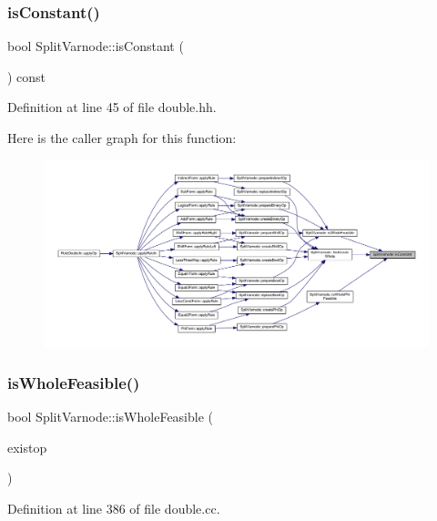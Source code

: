 \subsubsection{\texorpdfstring{isConstant()}{isConstant()}}
{\footnotesize\ttfamily bool Split\+Varnode\+::is\+Constant (\begin{DoxyParamCaption}\item[{void}]{ }\end{DoxyParamCaption}) const\hspace{0.3cm}{\ttfamily [inline]}}



Definition at line 45 of file double.\+hh.

Here is the caller graph for this function\+:
\nopagebreak
\begin{figure}[H]
\begin{center}
\leavevmode
\includegraphics[width=350pt]{class_split_varnode_aab8d8d52dc075984f318ae17dc6522dd_icgraph}
\end{center}
\end{figure}
\mbox{\label{class_split_varnode_a6a47b2837232b23935419b5e62643991}} 
\subsubsection{\texorpdfstring{isWholeFeasible()}{isWholeFeasible()}}
{\footnotesize\ttfamily bool Split\+Varnode\+::is\+Whole\+Feasible (\begin{DoxyParamCaption}\item[{\mbox{\hyperlink{class_pcode_op}{Pcode\+Op}} $\ast$}]{existop }\end{DoxyParamCaption})}



Definition at line 386 of file double.\+cc.

